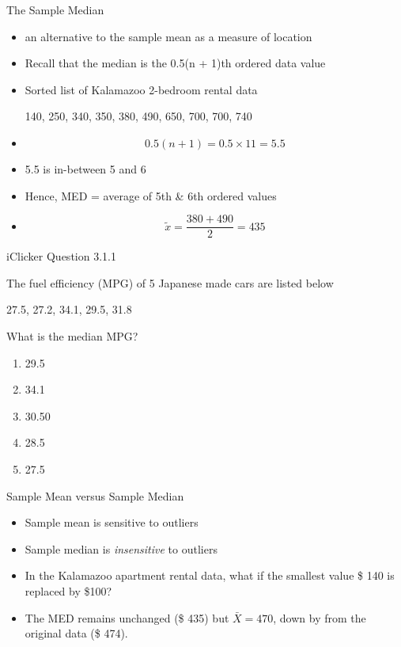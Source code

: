 \documentclass[14pt]{beamer}\usepackage[]{graphicx}\usepackage[]{color}
\begin{document}
\begin{frame}[fragile]{The Sample Median}



{\footnotesize{
\begin{itemize}
\item<1-> an alternative to the sample mean as a measure of location

\item<1-> Recall that the median is the 0.5(n + 1)th ordered data value

\item<1-> Sorted list of Kalamazoo 2-bedroom rental data

\vspace{3mm}

140, 250, 340, 350, 380, 490, 650, 700, 700, 740
\item<2->
\begin{equation*}
0.5(n + 1) = 0.5 \times 11 = 5.5
\end{equation*}

\item<3-> 5.5 is in-between 5 and 6
\item<4-> Hence, MED = average of 5th \& 6th ordered values
\item<5->
\begin{equation*}
\tilde{x} = \frac{ 380 + 490 }{2} = 435
\end{equation*}
\end{itemize}
}}
\end{frame}

\begin{frame}[fragile]{iClicker Question 3.1.1}


The fuel efficiency (MPG) of 5 Japanese made cars are listed below

\begin{center}
27.5, 27.2, 34.1, 29.5, 31.8
\end{center}

What is the median MPG?

\begin{enumerate}
\item 29.5
\item 34.1
\item 30.50
\item 28.5
\item 27.5
\end{enumerate}
\end{frame}

\begin{frame}[fragile]{Sample Mean versus Sample Median}

\begin{itemize}
\item<1-> Sample mean is sensitive to outliers
\item<2-> Sample median is \textit{insensitive} to outliers
\item<3-> In the Kalamazoo apartment rental data, what if the smallest value \$ 140 is replaced by \$100?
\item<4-> The MED remains unchanged (\$ 435) but $\bar{X} = 470$, down by from the original data (\$ 474).
\end{itemize}
\end{frame}
\end{document}
